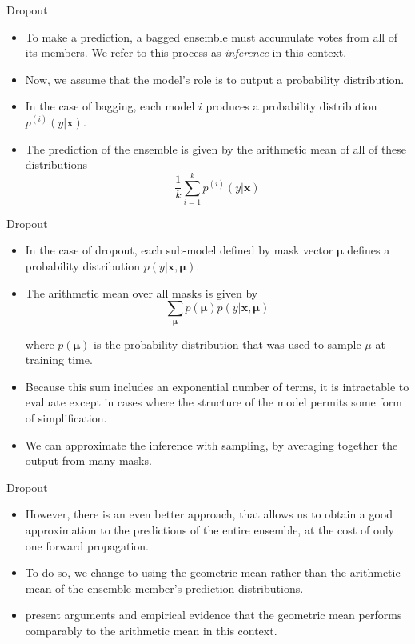 \documentclass[10pt]{beamer}
\begin{document}
	\begin{frame}{Dropout}
		\begin{itemize}
			\item To make a prediction, a bagged ensemble must accumulate votes from all of its members. We refer to this process as \emph{inference} in this context.
			\pause
			\item Now, we assume that the model's role is to output a probability distribution.
			\pause
			\item In the case of bagging, each model $i$ produces a probability distribution $p^{(i)}(y|\bm{x})$. 
			\pause
			\item The prediction of the ensemble is given by the arithmetic mean of all of these distributions
			$$\frac{1}{k}\sum_{i=1}^kp^{(i)}(y|\bm{x})$$			
		\end{itemize}
	\end{frame}
	
	\begin{frame}{Dropout}
		\begin{itemize}
			\item In the case of dropout, each sub-model defined by mask vector $\bm{\mu}$ defines a probability distribution $p(y|\bm{x},\bm{\mu})$.
			\pause
			\item The arithmetic mean over all masks is given by
			$$\sum_{\bm{\mu}} p(\bm{\mu})p(y|\bm{x},\bm{\mu})$$
			
			where $p(\bm{\mu})$ is the probability distribution that was used to sample $\mu$ at training time.
			\pause
			\item Because this sum includes an exponential number of terms, it is intractable to evaluate except in cases where the structure of the model permits some form of simplification.
			\pause
			\item We can approximate the inference with sampling, by averaging together the output from many masks.
		\end{itemize}
	\end{frame}
	
	\begin{frame}{Dropout}
		\begin{itemize}
			\item However, there is an even better approach, that allows us to obtain a good approximation to the predictions of the entire ensemble, at the cost of only one forward propagation.
			\pause
			\item To do so, we change to using the geometric mean rather than the arithmetic mean of the ensemble member's prediction distributions.
			\pause
			\item \citet{warde2013empirical} present arguments and empirical evidence that the geometric mean performs comparably to the arithmetic mean in this context.
		\end{itemize}
	\end{frame}
	
\end{document}
